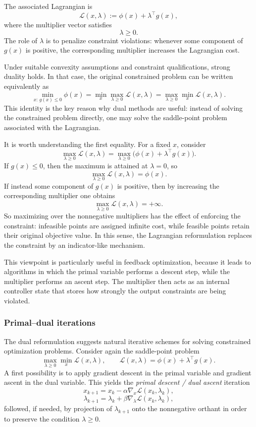The associated Lagrangian is
\[
\mathcal L(x,\lambda):=\phi(x)+\lambda^\top g(x),
\]
where the multiplier vector satisfies
\[
\lambda\ge 0.
\]
The role of $\lambda$ is to penalize constraint violations: whenever some component of $g(x)$ is positive, the corresponding multiplier increases the Lagrangian cost.

Under suitable convexity assumptions and constraint qualifications, strong duality holds. In that case, the original constrained problem can be written equivalently as
\[
\min_{x:\, g(x)\le 0}\phi(x)
=
\min_x \max_{\lambda\ge 0}\mathcal L(x,\lambda)
=
\max_{\lambda\ge 0}\min_x \mathcal L(x,\lambda).
\]
This identity is the key reason why dual methods are useful: instead of solving the constrained problem directly, one may solve the saddle-point problem associated with the Lagrangian.

It is worth understanding the first equality. For a fixed $x$, consider
\[
\max_{\lambda\ge 0}\mathcal L(x,\lambda)
=
\max_{\lambda\ge 0}\bigl(\phi(x)+\lambda^\top g(x)\bigr).
\]
If $g(x)\le 0$, then the maximum is attained at $\lambda=0$, so
\[
\max_{\lambda\ge 0}\mathcal L(x,\lambda)=\phi(x).
\]
If instead some component of $g(x)$ is positive, then by increasing the corresponding multiplier one obtains
\[
\max_{\lambda\ge 0}\mathcal L(x,\lambda)=+\infty.
\]
So maximizing over the nonnegative multipliers has the effect of enforcing the constraint: infeasible points are assigned infinite cost, while feasible points retain their original objective value. In this sense, the Lagrangian reformulation replaces the constraint by an indicator-like mechanism.

This viewpoint is particularly useful in feedback optimization, because it leads to algorithms in which the primal variable performs a descent step, while the multiplier performs an ascent step. The multiplier then acts as an internal controller state that stores how strongly the output constraints are being violated.

\subsubsection{Primal--dual iterations}

The dual reformulation suggests natural iterative schemes for solving constrained optimization problems. Consider again the saddle-point problem
\[
\max_{\lambda\ge 0}\min_x \mathcal L(x,\lambda),
\qquad
\mathcal L(x,\lambda)=\phi(x)+\lambda^\top g(x).
\]
A first possibility is to apply gradient descent in the primal variable and gradient ascent in the dual variable. This yields the \emph{primal descent / dual ascent} iteration
\[
x_{k+1}=x_k-\alpha \nabla_x \mathcal L(x_k,\lambda_k),
\]
\[
\lambda_{k+1}=\lambda_k+\beta \nabla_\lambda \mathcal L(x_k,\lambda_k),
\]
followed, if needed, by projection of $\lambda_{k+1}$ onto the nonnegative orthant in order to preserve the condition $\lambda\ge 0$.

